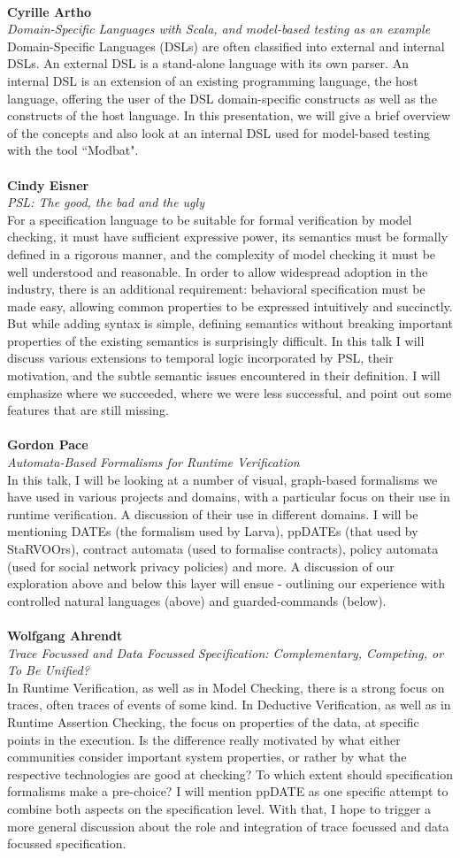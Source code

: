 \documentclass{article}
\newcounter{talkc}
\newcommand{\talk}[3]{\stepcounter{talkc}
\vspace{0.5em}~\\
\noindent
\textbf{#1}\\ 
\noindent\emph{#2}\\ 
\noindent#3\\
}
\begin{document}
\talk{Cyrille Artho}{Domain-Specific Languages with Scala, and model-based testing as an example}
{Domain-Specific Languages (DSLs) are often classified into external and internal DSLs. An external DSL is a stand-alone language with its own parser. An internal DSL is an extension of an existing programming language, the host language, offering the user of the DSL domain-specific constructs as well as the constructs of the host language. In this presentation, we will give a brief overview of the concepts and also look at an internal DSL used for model-based testing with the tool ``Modbat".}
%
\talk{Cindy Eisner}{PSL: The good, the bad and the ugly}{For a specification language to be suitable for formal verification by model checking, it must have sufficient expressive power, its semantics must be formally defined in a rigorous manner, and the complexity of model checking it must be well understood and reasonable. In order to allow widespread adoption in the industry, there is an additional requirement: behavioral specification must be made easy, allowing common properties to be expressed intuitively and succinctly. But while adding syntax is simple, defining semantics without breaking important properties of the existing semantics is surprisingly difficult. In this talk I will discuss various extensions to temporal logic incorporated by PSL, their motivation, and the subtle semantic issues encountered in their definition. I will emphasize where we succeeded, where we were less successful, and point out some features that are still missing.}
%
%
\talk{Gordon Pace}{Automata-Based Formalisms for Runtime Verification}{In this talk, I will be looking at a number of visual, graph-based formalisms we have used in various projects and domains, with a particular focus on their use in runtime verification. A discussion of their use in different domains. I will be mentioning DATEs (the formalism used by Larva), ppDATEs (that used by StaRVOOrs), contract automata (used to formalise contracts), policy automata (used for social network privacy policies) and more. A discussion of our exploration above and below this layer will ensue - outlining our experience with controlled natural languages (above) and guarded-commands (below).}
%
\talk{Wolfgang Ahrendt}{Trace Focussed and Data Focussed Specification: Complementary, Competing, or To Be Unified?}{In Runtime Verification, as well as in Model Checking, there is a strong focus on traces, often traces of events of some kind. In Deductive Verification, as well as in Runtime Assertion Checking, the focus on properties of the data, at specific points in the execution. Is the difference really motivated by what either communities consider important system properties, or rather by what the respective technologies are good at checking? To which extent should specification formalisms make a pre-choice? I will mention ppDATE as one specific attempt to combine both aspects on the specification level. With that, I hope to trigger a more general discussion about the role and integration of trace focussed and data focussed specification.}
\end{document}
